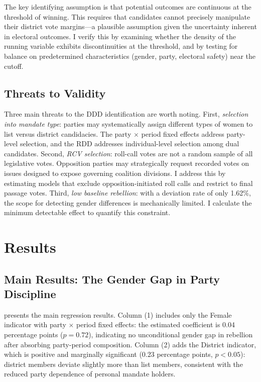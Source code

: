 \documentclass[12pt]{article}
\begin{document}
The key identifying assumption is that potential outcomes are continuous at the threshold of winning. This requires that candidates cannot precisely manipulate their district vote margins---a plausible assumption given the uncertainty inherent in electoral outcomes. I verify this by examining whether the density of the running variable exhibits discontinuities at the threshold, and by testing for balance on predetermined characteristics (gender, party, electoral safety) near the cutoff.

\subsection{Threats to Validity}

Three main threats to the DDD identification are worth noting. First, \textit{selection into mandate type}: parties may systematically assign different types of women to list versus district candidacies. The party $\times$ period fixed effects address party-level selection, and the RDD addresses individual-level selection among dual candidates. Second, \textit{RCV selection}: roll-call votes are not a random sample of all legislative votes. Opposition parties may strategically request recorded votes on issues designed to expose governing coalition divisions. I address this by estimating models that exclude opposition-initiated roll calls and restrict to final passage votes. Third, \textit{low baseline rebellion}: with a deviation rate of only 1.62\%, the scope for detecting gender differences is mechanically limited. I calculate the minimum detectable effect to quantify this constraint.


\section{Results}\label{sec:results}

\subsection{Main Results: The Gender Gap in Party Discipline}

 presents the main regression results. Column (1) includes only the Female indicator with party $\times$ period fixed effects: the estimated coefficient is 0.04 percentage points ($p = 0.72$), indicating no unconditional gender gap in rebellion after absorbing party-period composition. Column (2) adds the District indicator, which is positive and marginally significant (0.23 percentage points, $p < 0.05$): district members deviate slightly more than list members, consistent with the reduced party dependence of personal mandate holders.
\end{document}
